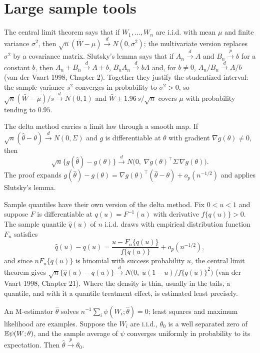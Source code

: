 \section{Large sample tools}\label{sec:bg:large}



The central limit theorem says that if $W_1, \dots, W_n$ are i.i.d. with mean $\mu$ and finite variance $\sigma^2$, then $\sqrt{n}(\bar W - \mu) \xrightarrow{d} N(0, \sigma^2)$; the multivariate version replaces $\sigma^2$ by a covariance matrix. Slutsky's lemma says that if $A_n \xrightarrow{d} A$ and $B_n \xrightarrow{p} b$ for a constant $b$, then $A_n + B_n \xrightarrow{d} A + b$, $B_nA_n \xrightarrow{d} bA$ and, for $b \ne 0$, $A_n/B_n \xrightarrow{d} A/b$ (van der Vaart 1998, Chapter 2). Together they justify the studentized interval: the sample variance $s^2$ converges in probability to $\sigma^2 > 0$, so $\sqrt{n}(\bar W - \mu)/s \xrightarrow{d} N(0, 1)$ and $\bar W \pm 1.96\,s/\sqrt{n}$ covers $\mu$ with probability tending to $0.95$.

The delta method carries a limit law through a smooth map. If $\sqrt{n}(\hat\theta - \theta) \xrightarrow{d} N(0, \Sigma)$ and $g$ is differentiable at $\theta$ with gradient $\nabla g(\theta) \ne 0$, then
\[
\sqrt{n}\{g(\hat\theta) - g(\theta)\} \xrightarrow{d} N\bigl(0,\; \nabla g(\theta)^\top\Sigma\,\nabla g(\theta)\bigr).
\]
The proof expands $g(\hat\theta) - g(\theta) = \nabla g(\theta)^\top(\hat\theta - \theta) + o_p(n^{-1/2})$ and applies Slutsky's lemma.

Sample quantiles have their own version of the delta method. Fix $0 < u < 1$ and suppose $F$ is differentiable at $q(u) = F^{-1}(u)$ with derivative $f\{q(u)\} > 0$. The sample quantile $\hat q(u)$ of $n$ i.i.d. draws with empirical distribution function $F_n$ satisfies
\[
\hat q(u) - q(u) = \frac{u - F_n\{q(u)\}}{f\{q(u)\}} + o_p(n^{-1/2}),
\]
and since $nF_n\{q(u)\}$ is binomial with success probability $u$, the central limit theorem gives $\sqrt{n}\{\hat q(u) - q(u)\} \xrightarrow{d} N\bigl(0,\; u(1 - u)/f\{q(u)\}^2\bigr)$ (van der Vaart 1998, Chapter 21). Where the density is thin, usually in the tails, a quantile, and with it a quantile treatment effect, is estimated least precisely.

An M-estimator $\hat\theta$ solves $n^{-1}\sum_i \psi(W_i; \hat\theta) = 0$; least squares and maximum likelihood are examples. Suppose the $W_i$ are i.i.d., $\theta_0$ is a well separated zero of $\mathbb{E}\psi(W; \theta)$, and the sample average of $\psi$ converges uniformly in probability to its expectation. Then $\hat\theta \xrightarrow{p} \theta_0$.

